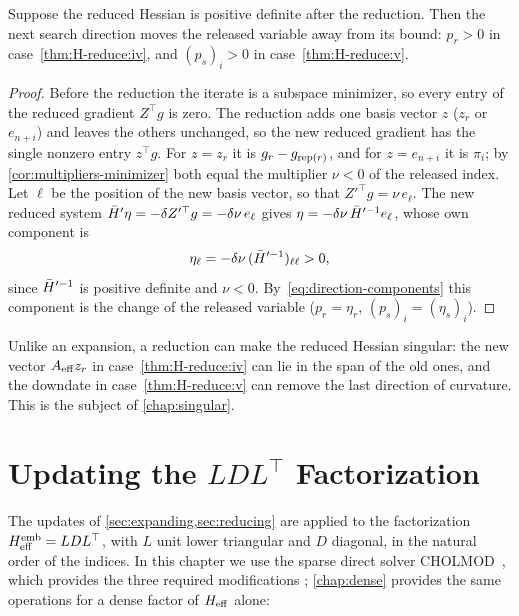 \begin{lemma} \label{lem:descent}
Suppose the reduced Hessian is positive definite after the reduction. Then the next search
direction moves the released variable away from its bound: $p_r>0$ in case~\ref{thm:H-reduce:iv}, and
$(p_s)_i>0$ in case~\ref{thm:H-reduce:v}.
\end{lemma}

\begin{proof}
Before the reduction the iterate is a subspace minimizer, so every entry of the reduced
gradient $Z^\top g$ is zero. The reduction adds one basis vector $z$ ($z_r$ or $e_{n+i}$) and
leaves the others unchanged, so the new reduced gradient has the single nonzero entry
$z^\top g$. For $z = z_r$ it is $g_r - g_{\operatorname{rep}(r)}$, and for $z = e_{n+i}$ it is $\pi_i$; by
\cref{cor:multipliers-minimizer} both equal the multiplier $\nu<0$ of the released index. Let
$\ell$ be the position of the new basis vector, so that $Z'^\top g = \nu\,e_\ell$. The new reduced
system $\bar{H}'\eta = -\delta Z'^\top g = -\delta\nu\,e_\ell$ gives $\eta = -\delta\nu\,\bar{H}'^{-1}e_\ell$,
whose own component is
\[
\eta_\ell = -\delta\nu\,(\bar{H}'^{-1})_{\ell\ell} > 0,
\]
since $\bar{H}'^{-1}$ is positive definite and $\nu<0$. By~\eqref{eq:direction-components} this
component is the change of the released variable ($p_r = \eta_r$, $(p_s)_i = (\eta_s)_i$).
\end{proof}

Unlike an expansion, a reduction can make the reduced Hessian singular: the new vector $A_{\mathrm{eff}} z_r$ in
case~\ref{thm:H-reduce:iv} can lie in the span of the old ones, and the downdate in case~\ref{thm:H-reduce:v} can remove the
last direction of curvature. This is the subject of \cref{chap:singular}.


\section{Updating the \texorpdfstring{$LDL^\top$}{LDL\textasciicircum T} Factorization}
\label{sec:ldl-updates}

The updates of \cref{sec:expanding,sec:reducing} are applied to the factorization
$H_{\mathrm{eff}}^{\mathrm{emb}} = LDL^\top$, with $L$ unit lower triangular and $D$ diagonal, in the
natural order of the indices. In this chapter we use the sparse direct solver
CHOLMOD~\cite{chen2008cholmod}, which provides the three required modifications
\cite{davis1999modifying, davis2005row}; \cref{chap:dense} provides the same operations for a
dense factor of $H_{\mathrm{eff}}$ alone:

